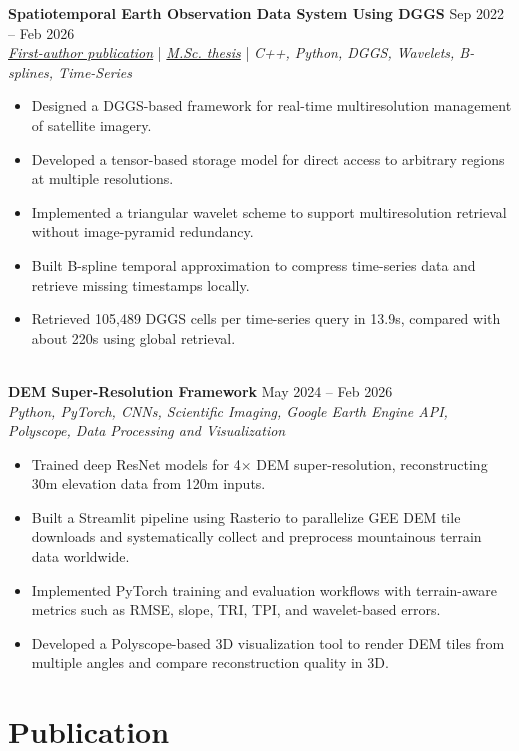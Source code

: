 \documentclass[a4paper,10pt]{article}
\begin{document}
\noindent
\textbf{Spatiotemporal Earth Observation Data System Using DGGS} \hfill Sep 2022 -- Feb 2026 \\
\textit{\href{https://doi.org/10.3390/rs17040570}{First-author publication}} | \textit{\href{https://ucalgary.scholaris.ca/items/114b394b-e516-4732-bd3a-45dd6160d480}{M.Sc. thesis}} | \textit{C++, Python, DGGS, Wavelets, B-splines, Time-Series}
\begin{itemize}[leftmargin=0.25in]
    \item Designed a DGGS-based framework for real-time multiresolution management of satellite imagery.
    \item Developed a tensor-based storage model for direct access to arbitrary regions at multiple resolutions.
    \item Implemented a triangular wavelet scheme to support multiresolution retrieval without image-pyramid redundancy.
    \item Built B-spline temporal approximation to compress time-series data and retrieve missing timestamps locally.
    \item Retrieved 105,489 DGGS cells per time-series query in 13.9s, compared with about 220s using global retrieval.
\end{itemize}

\noindent \\
\textbf{DEM Super-Resolution Framework} \hfill May 2024 -- Feb 2026 \\
\textit{Python, PyTorch, CNNs, Scientific Imaging, Google Earth Engine API, Polyscope, Data Processing and Visualization}
\begin{itemize}[leftmargin=0.25in]
    \item Trained deep ResNet models for 4$\times$ DEM super-resolution, reconstructing 30m elevation data from 120m inputs.
    \item Built a Streamlit pipeline using Rasterio to parallelize GEE DEM tile downloads and systematically collect and preprocess mountainous terrain data worldwide.
    \item Implemented PyTorch training and evaluation workflows with terrain-aware metrics such as RMSE, slope, TRI, TPI, and wavelet-based errors.
    \item Developed a Polyscope-based 3D visualization tool to render DEM tiles from multiple angles and compare reconstruction quality in 3D.
\end{itemize}

\section*{Publication}
\end{document}
